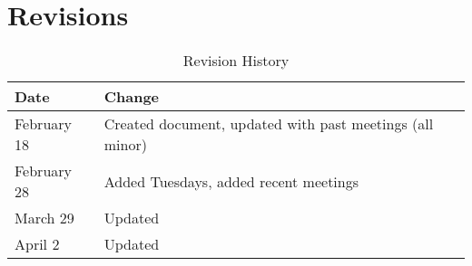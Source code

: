 \documentclass{article}
\begin{document}
\newpage

\section{Revisions}

\begin{table}[hp]
\caption{Revision History} \label{tbl:rev}
\begin{tabularx}{\textwidth}{lX}
\toprule
\textbf{Date} & \textbf{Change}\\
\midrule
February 18& Created document, updated with past meetings (all minor) \\
February 28 & Added Tuesdays, added recent meetings \\
March 29 & Updated \\
April 2 & Updated \\
\bottomrule
\end{tabularx}
\end{table}
\end{document}
